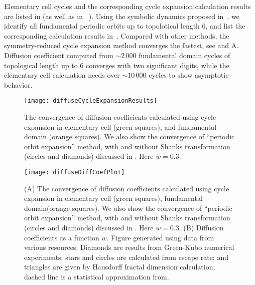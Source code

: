 Elementary cell cycles and the corresponding cycle expansion 
calculation results are listed in  (as well as in 
~\cite{CGS92}). Using the symbolic 
dynamics proposed in~, we 
identify all fundamental periodic orbits up to topolotical length 6,  
and list the corresponding calculation results  
in~. 
Compared with other methods, the symmetry-reduced cycle expansion 
method converges
the fastest, see  and A. Diffusion
coefficient computed from $\sim2\,000$ fundamental domain cycles of
topological length up to 6 converges with two significant digits, 
while the elementary cell calculation needs over $\sim 10\,000$ 
cycles to show asymptotic behavior.

\begin{figure}
	\texttt{[image: diffuseCycleExpansionResults]}
	\caption{\label{fig-convergence}The convergence of diffusion 
	coefficients  calculated using cycle		
		expansion in elementary cell (green squares), and fundamental 
		domain (orange squares). We also show the convergence of 
		``periodic orbit expansion'' method, with and  without Shanks 
		transformation (circles and diamonds) discussed in  
		. Here $w = 0.3$.
		}
\end{figure}
\begin{figure}
	\texttt{[image: diffuseDiffCoefPlot]}
	\caption[Diffusion coefficients computed using cycle expansion 
	formulas]{\label{fig-results} 
		(A) The convergence of diffusion coefficients  calculated 
		using cycle
		expansion in elementary cell (green squares),  fundamental
		domain(orange squares). We  also show the convergence of 
		``periodic
		orbit expansion'' method, with and  without Shanks 
		transformation
		(circles and diamonds) discussed in  . 
		Here $w =
		0.3$. (B) Diffusion coefficients as a function $w$.  Figure
		generated using data from various resources. Diamonds are 
		results
		from  Green-Kubo numerical experiments;
		stars and  circles are calculated 
		from
		escape rate; and triangles are  given by Hausdorff fractal 
		dimension
		calculation; dashed line  is a statistical
		approximation from.}
\end{figure}

